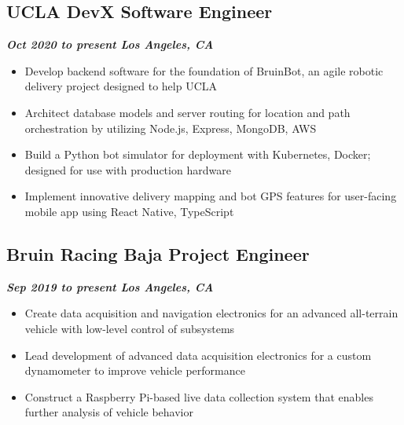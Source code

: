 \documentclass[10pt]{article}
\begin{document}
\begin{raggedright}
        \subsection*{\textbf{\large{UCLA DevX \textendash{} Software Engineer}}} \hfill \textbf{\textit{Oct 2020 to present \textendash{} Los Angeles, CA}}
        \begin{itemize}
            \item Develop backend software for the foundation of BruinBot, an agile robotic delivery project designed to help UCLA
            \item Architect database models and server routing for location and path orchestration by utilizing Node.js, Express, MongoDB, AWS
            \item Build a Python bot simulator for deployment with Kubernetes, Docker; designed for use with production hardware
            \item Implement innovative delivery mapping and bot GPS features for user-facing mobile app using React Native, TypeScript
        \end{itemize}

        \subsection*{\textbf{\large{Bruin Racing Baja \textendash{} Project Engineer}}} \hfill \textbf{\textit{Sep 2019 to present \textendash{} Los Angeles, CA}}
        \begin{itemize}
            \item Create data acquisition and navigation electronics for an advanced all-terrain vehicle with low-level control of subsystems
            \item Lead development of advanced data acquisition electronics for a custom dynamometer to improve vehicle performance
            \item Construct a Raspberry Pi-based live data collection system that enables further analysis of vehicle behavior
        \end{itemize}
        

\end{raggedright}
\end{document}
